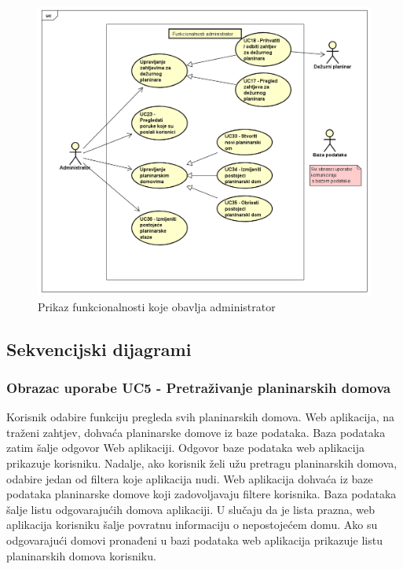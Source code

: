 		\begin{figure}[H]
			\includegraphics[scale=0.5]{dijagrami/administrator-funkcionalnosti.png} %
			\centering
			\caption{Prikaz funkcionalnosti koje obavlja administrator}
			\label{fig:UC dijagrami}
		\end{figure}
				
				
			\newpage	
				
			\subsection{Sekvencijski dijagrami}
			
			\subsubsection{Obrazac uporabe UC5 - Pretraživanje planinarskih domova}
			
			Korisnik odabire funkciju pregleda svih planinarskih domova. Web aplikacija, na traženi zahtjev, dohvaća planinarske domove iz baze podataka. Baza podataka zatim šalje odgovor Web aplikaciji. Odgovor baze podataka web aplikacija prikazuje korisniku. Nadalje, ako korisnik želi užu pretragu               planinarskih domova, odabire jedan od filtera koje aplikacija nudi. Web aplikacija dohvaća iz baze podataka planinarske domove koji zadovoljavaju filtere korisnika. Baza podataka šalje listu odgovarajućih domova aplikaciji. U slučaju da je lista prazna, web aplikacija korisniku šalje povratnu informaciju o nepostojećem domu. Ako su odgovarajući domovi pronađeni u bazi podataka web aplikacija prikazuje listu planinarskih domova korisniku. 
				
